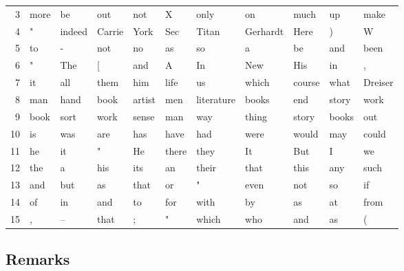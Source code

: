 \begin{table}[htb]
\begin{center}
{\begin{tabular}{|@{\hspace{0.10em}}r@{\hspace{0.40em}}|*{10}{@{\hspace{0.28em}}l@{\hspace{0.28em}}}|}
        \rule{0pt}{2.0ex} 3  & more  & be     & out      & not    & X     & only       & on       & much   & up      & make    \\
        \rule{0pt}{2.0ex} 4  & "     & indeed & Carrie   & York   & Sec   & Titan      & Gerhardt & Here   & )       & W       \\
        \rule{0pt}{2.0ex} 5  & to    & -      & not      & no     & as    & so         & a        & be     & and     & been    \\
        \rule{0pt}{2.0ex} 6  & "     & The    & [        & and    & A     & In         & New      & His    & in      & ,       \\
        \rule{0pt}{2.0ex} 7  & it    & all    & them     & him    & life  & us         & which    & course & what    & Dreiser \\
        \rule{0pt}{2.0ex} 8  & man   & hand   & book     & artist & men   & literature & books    & end    & story   & work    \\
        \rule{0pt}{2.0ex} 9  & book  & sort   & work     & sense  & man   & way        & thing    & story  & books   & out     \\
        \rule{0pt}{2.0ex} 10 & is    & was    & are      & has    & have  & had        & were     & would  & may     & could   \\
        \rule{0pt}{2.0ex} 11 & he    & it     & "        & He     & there & they       & It       & But    & I       & we      \\
        \rule{0pt}{2.0ex} 12 & the   & a      & his      & its    & an    & their      & that     & this   & any     & such    \\
        \rule{0pt}{2.0ex} 13 & and   & but    & as       & that   & or    & "          & even     & not    & so      & if      \\
        \rule{0pt}{2.0ex} 14 & of    & in     & and      & to     & for   & with       & by       & as     & at      & from    \\
        \rule{0pt}{2.0ex} 15 & ,     & --     & that     & ;      & "     & which      & who      & and    & as      & (       \\[0.5ex]
        \hline
      \end{tabular}
    }\end{center}
  \label{tab:POS}
\end{table}

\subsection{Remarks}
\label{sec:DHMMRemarks}

